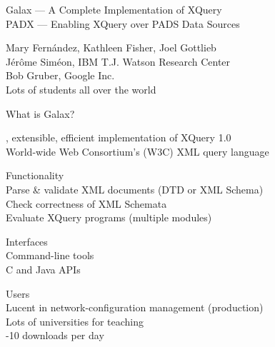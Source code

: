 \documentclass[landscape]{slides}
\begin{document}

\begin{slide}
\begin{center}\large\color{blue}
Galax ---  A Complete Implementation of XQuery\\
PADX --- Enabling XQuery over PADS Data Sources

\large\color{black}
\begin{center}
Mary Fern\'andez, Kathleen Fisher, Joel Gottlieb\\
J\'er\^ome Sim\'eon, IBM T.J. Watson Research Center\\
Bob Gruber, Google Inc.\\
Lots of students all over the world
\end{center}
\end{center}
\end{slide}

\begin{Slide}{What is Galax?}

  \vspace*{1cm}
  , {extensible}, {efficient} implementation of XQuery 1.0\\
  \bbb World-wide Web Consortium's (W3C) XML query language 

  \bb Functionality\\
  \bbb Parse \& validate XML documents (DTD or XML Schema) \\
  \bbb Check correctness of XML Schemata\\
  \bbb Evaluate XQuery programs (multiple modules)

  \bb Interfaces \\
  \bbb Command-line tools \\
  \bbb C and Java APIs

  \bb Users\\
  \bbb Lucent in network-configuration management (production)\\
  \bbb Lots of universities for teaching \\
  -10 downloads per day 

\end{Slide}
\end{document}
